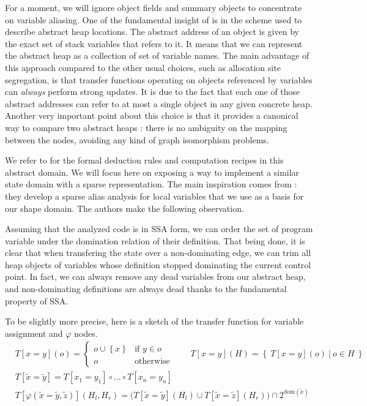 \documentclass[11pt]{article}
\renewcommand{\phi}{\varphi}
\begin{document}
For a moment, we will ignore object fields and summary objects to concentrate on variable aliasing.
One of the fundamental insight of \cite{ssc} is in the scheme used to describe abstract heap locations.
The abstract address of an object is given by the exact set of stack variables that refers to it.
It means that we can represent the abstract heap as a collection of set of variable names.
The main advantage of this approach compared to the other usual choices, such as allocation site segregation, is that transfer functions operating on objects referenced by variables can \emph{always} perform strong updates.
It is due to the fact that each one of those abstract addresses can refer to at most a single object in any given concrete heap.
Another very important point about this choice is that it provides a canonical way to compare two abstract heaps : there is no ambiguity on the mapping between the nodes, avoiding any kind of graph isomorphism problems.

We refer to \cite{ssc} for the formal deduction rules and computation recipes in this abstract domain.
We will focus here on exposing a way to implement a similar state domain with a sparse representation.
The main inspiration comes from \cite{ssa-alias} : they develop a sparse alias analysis for local variables that we use as a basis for our shape domain. The authors make the following observation.

Assuming that the analyzed code is in SSA form, we can order the set of program variable under the domination relation of their definition.
That being done, it is clear that when transfering the state over a non-dominating edge, we can trim all heap objects of variables whose definition stopped dominating the current control point. In fact, we can always remove any dead variables from our abstract heap, and non-dominating definitions are always dead thanks to the fundamental property of SSA.

To be slightly more precise, here is a sketch of the transfer function for variable assignment and $\phi$ nodes.
\[
\begin{aligned}
&T[x=y](o) = \begin{cases}
o \cup \left\{ x \right\} & \text{if } y \in o \\
o & \text{otherwise}
\end{cases}
\qquad
T[x=y](H) = \left\{~T[x=y](o)~|~o \in H~\right\} \\
& T[\tilde{x}=\tilde{y}] = T[x_1=y_1]\circ\dots\circ T[x_n=y_n] \\
&T[\phi(\tilde{x}=\tilde{y},\tilde{z})](H_l,H_r) = \big( T[\tilde{x}=\tilde{y}](H_l)\cup T[\tilde{x}=\tilde{z}](H_r) \big)\cap 2^{\text{dom}(\tilde{x})}
\end{aligned}
\]
\end{document}
